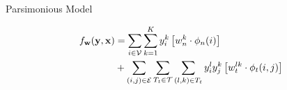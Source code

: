 \documentclass{beamer}
\newcommand{\x}{{\mathbf x}}     %
\newcommand{\y}{{\mathbf y}}     %
\newcommand{\ysc}[2]{{y_{#1}^{#2}}}    %
\newcommand{\fn}[1]{{\phi_n(#1)}}      %
\newcommand{\fe}[3]{{\phi_{#1}(#2,#3)}}%
\newcommand{\w}{{\mathbf w}}           %
\newcommand{\wn}[1]{{w_n^{#1}}}        %
\newcommand{\we}[3]{{w_{#1}^{#2#3}}}   %
\newcommand{\df}[3]{{f_{#3}(#1,#2)}}   %
\begin{document}
\begin{frame}{Parsimonious Model}




\begin{equation} \label{eq:model}
\begin{split}
\df{\y}{\x}{\w} & = \sum_{i \in \mathcal{V}} \sum_{k=1}^{K} \ysc{i}{k} \left[\wn{k} \cdot \fn{i} \right] \\
 & + \sum_{(i,j)\in \mathcal{E}}   \sum_{T_t \in {\cal T}}  \sum_{(l,k)\in T_t} \ysc{i}{l} \ysc{j}{k}  \left[\we{t}{l}{k} \cdot \fe{t}{i}{j}\right] 
 \end{split}
\end{equation}


\end{frame}
\end{document}
